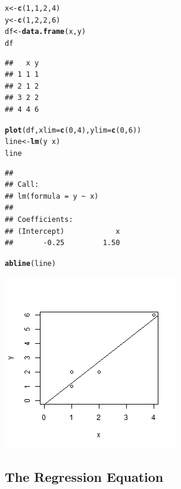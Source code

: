\documentclass{article}\usepackage[]{graphicx}\usepackage[]{color}
\makeatletter
\def\maxwidth{ %
  \ifdim\Gin@nat@width>\linewidth
    \linewidth
  \else
    \Gin@nat@width
  \fi
}
\newcommand{\hlnum}[1]{\textcolor[rgb]{0.686,0.059,0.569}{#1}}%
\newcommand{\hlopt}[1]{\textcolor[rgb]{0,0,0}{#1}}%
\newcommand{\hlstd}[1]{\textcolor[rgb]{0.345,0.345,0.345}{#1}}%
\newcommand{\hlkwb}[1]{\textcolor[rgb]{0.69,0.353,0.396}{#1}}%
\newcommand{\hlkwc}[1]{\textcolor[rgb]{0.333,0.667,0.333}{#1}}%
\newcommand{\hlkwd}[1]{\textcolor[rgb]{0.737,0.353,0.396}{\textbf{#1}}}%
\newenvironment{kframe}{%
 \def\at@end@of@kframe{}%
 \ifinner\ifhmode%
  \def\at@end@of@kframe{\end{minipage}}%
  \begin{minipage}{\columnwidth}%
 \fi\fi%
 \def\FrameCommand##1{\hskip\@totalleftmargin \hskip-\fboxsep
 \colorbox{shadecolor}{##1}\hskip-\fboxsep
     \hskip-\linewidth \hskip-\@totalleftmargin \hskip\columnwidth}%
 \MakeFramed {\advance\hsize-\width
   \@totalleftmargin\z@ \linewidth\hsize
   \@setminipage}}%
 {\par\unskip\endMakeFramed%
 \at@end@of@kframe}
\newenvironment{knitrout}{}{} %
\makeatother
\begin{document}
\begin{knitrout}
\color{fgcolor}\begin{kframe}
\begin{alltt}
\hlstd{x} \hlkwb{<-} \hlkwd{c}\hlstd{(}\hlnum{1}\hlstd{,}\hlnum{1}\hlstd{,}\hlnum{2}\hlstd{,}\hlnum{4}\hlstd{)}
\hlstd{y} \hlkwb{<-} \hlkwd{c}\hlstd{(}\hlnum{1}\hlstd{,}\hlnum{2}\hlstd{,}\hlnum{2}\hlstd{,}\hlnum{6}\hlstd{)}
\hlstd{df} \hlkwb{<-} \hlkwd{data.frame}\hlstd{(x,y)}
\hlstd{df}
\end{alltt}
\begin{verbatim}
##   x y
## 1 1 1
## 2 1 2
## 3 2 2
## 4 4 6
\end{verbatim}
\begin{alltt}
\hlkwd{plot}\hlstd{(df,} \hlkwc{xlim} \hlstd{=} \hlkwd{c}\hlstd{(}\hlnum{0}\hlstd{,} \hlnum{4}\hlstd{),} \hlkwc{ylim} \hlstd{=} \hlkwd{c}\hlstd{(}\hlnum{0}\hlstd{,} \hlnum{6}\hlstd{))}
\hlstd{line} \hlkwb{<-} \hlkwd{lm}\hlstd{(y} \hlopt{~} \hlstd{x)}
\hlstd{line}
\end{alltt}
\begin{verbatim}
## 
## Call:
## lm(formula = y ~ x)
## 
## Coefficients:
## (Intercept)            x  
##       -0.25         1.50
\end{verbatim}
\begin{alltt}
\hlkwd{abline}\hlstd{(line)}
\end{alltt}
\end{kframe}
\includegraphics[width=\maxwidth]{figure/ex14-03} 

\end{knitrout}

\subsection{The Regression Equation}
\end{document}
